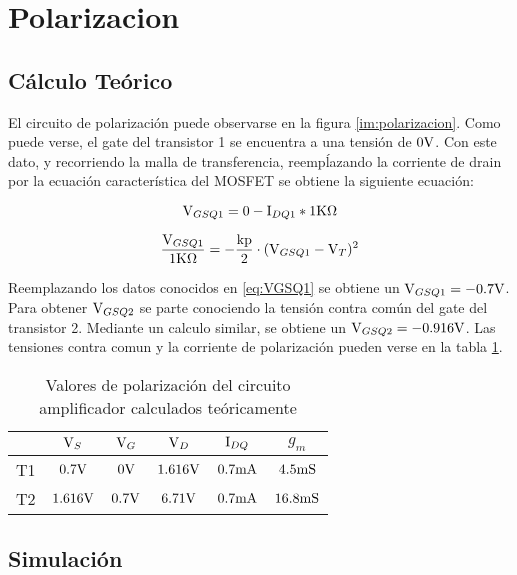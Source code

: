 \section{Polarizacion}
\subsection{Cálculo Teórico}

El circuito de polarización puede observarse en la figura \ref{im:polarizacion}. Como puede verse, el gate del transistor 1 se encuentra a una tensión de $0\mbox{V}$. Con este dato, y recorriendo la malla de transferencia, reempĺazando la corriente de drain por la ecuación característica del MOSFET se obtiene la siguiente ecuación:

\begin{equation}
	\mbox{V}_{GSQ1} = 0 - \mbox{I}_{DQ1} * 1\mbox{K}\Omega
\end{equation}

\begin{equation}
	\frac{\mbox{V}_{GSQ1}}{1\mbox{K}\Omega} = -\frac{\mbox{kp}}{2} \cdot (\mbox{V}_{GSQ1} - \mbox{V}_T)^2
	\label{eq:VGSQ1}
\end{equation}

Reemplazando los datos conocidos en \ref{eq:VGSQ1} se obtiene un $\mbox{V}_{GSQ1} = -0.7\mbox{V}$. Para obtener $\mbox{V}_{GSQ2}$ se parte conociendo la tensión contra común del gate del transistor 2. Mediante un calculo similar, se obtiene un $\mbox{V}_{GSQ2} = -0.916\mbox{V}$. Las tensiones contra comun y la corriente de polarización pueden verse en la tabla \ref{ta:datosPolarizacion}.

\begin{table}[ht]
	\begin{center}
		\begin{tabular}{|c|c|c|c|c|c|}
		\hline 
		 & $\mbox{V}_{S}$ & $\mbox{V}_{G}$ & $\mbox{V}_{D}$ & $\mbox{I}_{DQ}$ & $g_m$ \\ 
		\hline 
		T1 & $0.7\mbox{V}$ & $0\mbox{V}$ & $1.616\mbox{V}$ & $0.7\mbox{mA}$ & $4.5\mbox{mS}$ \\ 
		\hline 
		T2 & $1.616\mbox{V}$ & $0.7\mbox{V}$ & $6.71\mbox{V}$ & $0.7\mbox{mA}$ & $16.8\mbox{mS}$ \\ 
		\hline 
		\end{tabular} 
	\end{center}
	\caption{Valores de polarización del circuito amplificador calculados teóricamente}
	\label{ta:datosPolarizacion}
\end{table}


\subsection{Simulación}

